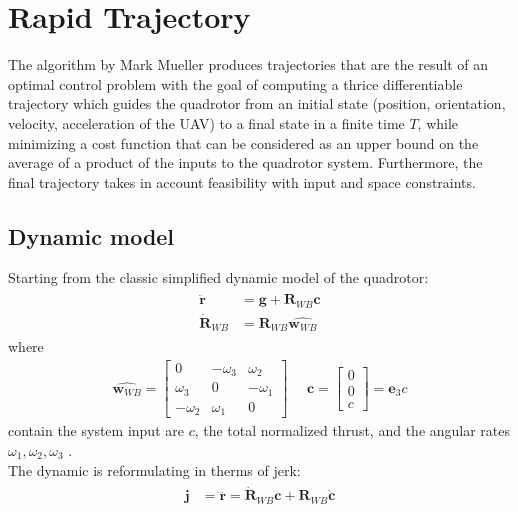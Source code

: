\section{Rapid Trajectory}
The algorithm by Mark Mueller  produces trajectories that are the result of an optimal control problem with the goal of computing a thrice differentiable trajectory which guides the quadrotor from an initial state (position, orientation, velocity, acceleration of the UAV) to a final state in a finite time $T$, while minimizing a cost function that can be considered as an upper bound on the average of a product of the inputs to the quadrotor system. Furthermore, the final trajectory takes in account feasibility with input and space constraints.\\
\subsection{Dynamic model}
Starting from the classic simplified dynamic model of the quadrotor:
\begin{align}
\begin{split}
\ddot{\boldsymbol{r}} &= \boldsymbol{g} + \boldsymbol{R}_{WB}\boldsymbol{c}  \\[10pt]
\dot{\boldsymbol{R}}_{WB} &= \boldsymbol{R}_{WB}\hat{\boldsymbol{w}_{WB}}
\end{split}
\end{align}
where 
\begin{align}
\hat{\boldsymbol{w}_{WB}} =
{\begin{bmatrix}
0 & -\omega_3 & \omega_2 \\[10pt]
\omega_3 & 0 & -\omega_1 \\[10pt]
-\omega_2 & \omega_1  & 0
\end{bmatrix}} \ \ \ \ \ \ \boldsymbol{c} = 
{\begin{bmatrix}
0 \\[10pt]
0 \\[10pt]
c
\end{bmatrix}} = \boldsymbol{e}_3c
\end{align}
contain the system input are  $c$, the total normalized thrust, and the angular rates $\omega_1,\omega_2,\omega_3$ .\\
The dynamic is reformulating in therms of jerk:
\begin{align}
\begin{split}
\boldsymbol{j} &= \dddot{\boldsymbol{r}} = \dot{\boldsymbol{R}}_{WB}\boldsymbol{c} + \boldsymbol{R}_{WB}\dot{\boldsymbol{c}}
\end{split}
\end{align}
